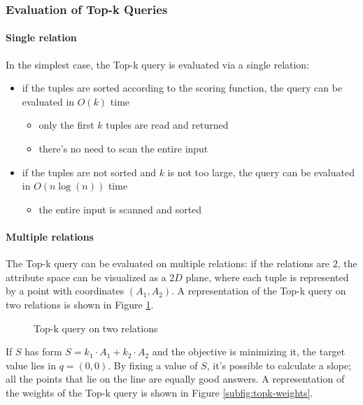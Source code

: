 \documentclass[english]{article}
\begin{document}
\subsubsection{Evaluation of Top-k Queries}

\paragraph{Single relation}

In the simplest case, the Top-k query is evaluated via a single relation:
\begin{itemize}
  \item if the tuples are sorted according to the scoring function, the query can be evaluated in \(O(k)\) time
        \begin{itemize}
          \item only the first \(k\) tuples are read and returned
          \item there's no need to scan the entire input
        \end{itemize}
  \item if the tuples are not sorted and \(k\) is not too large, the query can be evaluated in \(O(n\log(n))\) time
        \begin{itemize}
          \item the entire input is scanned and sorted
        \end{itemize}
\end{itemize}

\paragraph{Multiple relations}

The Top-k query can be evaluated on multiple relations: if the relations are \(2\), the attribute space can be visualized as a \(2D\) plane, where each tuple is represented by a point with coordinates \(\left( A_1, A_2 \right)\).
A representation of the Top-k query on two relations is shown in Figure \ref{fig:topk-2d-plane}.

\begin{figure}[htbp]
  \centering
  \bigskip
  \caption{Top-k query on two relations}
  \label{fig:topk-2d-plane}
  \bigskip
\end{figure}

If \(S\) has form \(S = k_1 \cdot A_1 + k_2 \cdot A_2\) and the objective is minimizing it, the target value lies in \(q = \left( 0, 0 \right)\).
By fixing a value of \(S\), it's possible to calculate a slope; all the points that lie on the line are equally good answers.
A representation of the weights of the Top-k query is shown in Figure \ref{subfig:topk-weights}.
\end{document}
